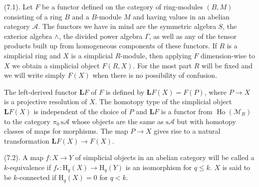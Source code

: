 \documentclass[10pt,reqno]{amsart}
\DeclareMathOperator{\Ho}{Ho}
\newcommand{\cat}{\mathcal}
\newcommand{\A}{\cat{A}}
\newcommand{\sA}{\mathrm{s}\A}
\newcommand{\M}{\cat{M}}
\renewcommand{\L}{\mathbf{L}}
\renewcommand{\H}{\mathrm{H}}
\begin{document}
(7.1). Let $F$ be a functor defined on the category of ring-modules $(B,M)$ consisting
of a ring $B$ and a $B$-module $M$ and having values in an abelian category $\A$.
The functors we have in mind are the symmetric algebra $S$, the exterior algebra
$\wedge$, the divided power algebra $\Gamma$, as well as any of the tensor products built
up from homogeneous components of these functors. If $R$ is a simplicial ring and
$X$ is a simplicial $R$-module, then applying $F$ dimension-wise to $X$ we obtain a
simplicial object $F(R,X)$. For the most part $R$ will be fixed and we will write
simply $F(X)$ when there is no possibility of confusion.

The left-derived functor $\L F$ of $F$ is defined by $\L F(X)=F(P)$, where
$P\to X$ is a projective resolution of $X$. The homotopy type of the simplicial object
$\L F(X)$ is independent of the choice of $P$ and $\L F$ is a functor from $\Ho(\M_R)$
to the category $\pi_0\,\sA$ whose objects are the same as $\sA$ but with homotopy
classes of maps for morphisms. The map $P\to X$ gives rise to a natural transformation
$\L F(X)\to F(X)$.

(7.2). A map $f:X\to Y$ of simplicial objects in an abelian category will be called
a $k$-equivalence if $f_\ast:\H_q(X)\to\H_q(Y)$ is an isomorphism for $q\leq k$. $X$
is said to be $k$-connected if $\H_q(X)=0$ for $q<k$.
\end{document}
